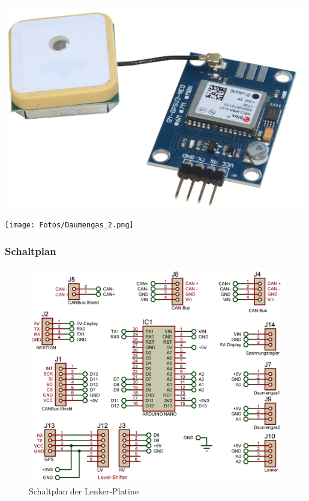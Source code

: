 \vspace{0.5cm}
\begin{minipage}{7.5cm}
    \centering
    \includegraphics[width=0.99\textwidth]{Fotos/GPS_Modul_2.png}
\end{minipage}
\hspace{0.1cm}
\begin{minipage}{7.5cm}
    \centering
    \texttt{[image: Fotos/Daumengas\_2.png]}
\end{minipage}

\newpage

\subsubsection{Schaltplan}
\begin{figure}[h]
    \centering
    \includegraphics[width=1.0\textwidth]{../Proteus/Exports/Lenker-Platine.png}    
    \caption{Schaltplan der Lenker-Platine\label{fig:plat:lenker}}
\end{figure}

